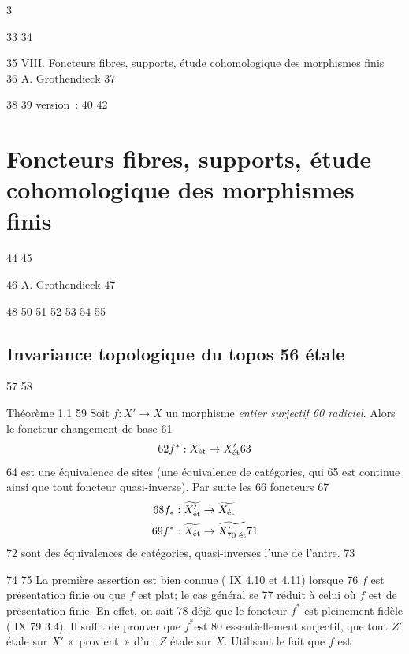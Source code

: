 3	\documentclass[10pt]{../fichiers-configuration-latex/smfart}
\begin{document}
    33	
    34	\begin{center}
    35	VIII. Foncteurs fibres, supports, étude cohomologique des morphismes finis\\
    36	A. Grothendieck
    37	\end{center}
    38	
    39	version : \showgitstatus{}
    40		
    42		\chapter{Foncteurs fibres, supports, étude cohomologique des morphismes finis}
    44	%
    45	\begin{center}
    46	A. Grothendieck
    47	\end{center}
    48		
    50	\setcounter{pageoriginal}{366}
    51	
    52	%
    53	%
    54	
    55	\section{Invariance topologique du topos
    56	  étale}
    57	
    58	\begin{enonce*}{Théorème 1.1}
    59	Soit \pageoriginale  $f : X'\to X$ un morphisme \emph{entier surjectif
    60	radiciel}. Alors le foncteur changement de base
    61	$$
    62	f^{\ast} : X_{\text{\rm ét}} \to X'_{\text{\rm ét}}
    63	$$
    64	est une équivalence de sites (\ie une équivalence de catégories, qui
    65	est continue ainsi que tout foncteur quasi-inverse). Par suite les
    66	foncteurs
    67	\begin{align*}
    68	f_{\ast} : \widetilde{X'_{\text{\rm ét}}} &\to \widetilde{X_{\text{\rm ét}}}\\
    69	f^{\ast} : \widetilde{X_{\text{\rm ét}}} &\to \widetilde{X'_{\text{\rm
    70	      ét}}}
    71	\end{align*}
    72	sont des équivalences de catégories, quasi-inverses l'une de l'antre.
    73	\end{enonce*}
    74	
    75	La première assertion est bien connue (\SGA{} IX 4.10 et 4.11) lorsque
    76	$f$ est présentation finie ou que $f$ est plat; le cas général se
    77	réduit à celui où $f$ est de présentation  finie. En effet, on sait
    78	déjà que le foncteur $f^{\ast}$ est pleinement fidèle ( IX
    79	3.4). Il suffit de prouver que $f^{\ast}$\pageoriginale  est
    80	essentiellement surjectif, \ie que tout $Z'$ étale sur $X'$ « provient » d'un $Z$ étale sur $X$. Utilisant le fait que $f$ est
\end{document}
